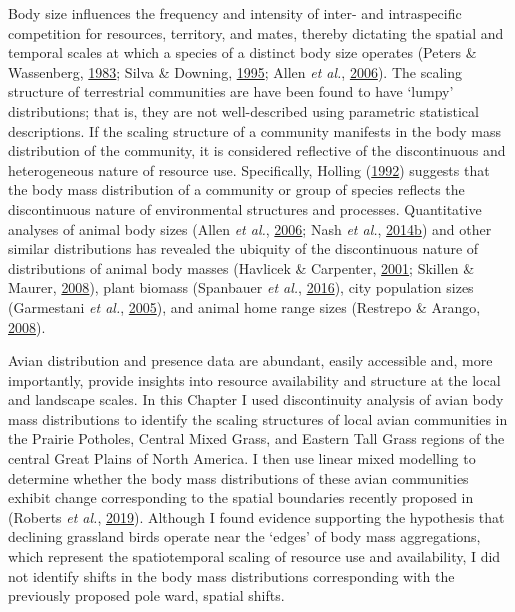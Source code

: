 \documentclass[12pt,twoside,openany]{reedthesis}
\begin{document}
Body size influences the frequency and intensity of inter- and intraspecific competition for resources, territory, and mates, thereby dictating the spatial and temporal scales at which a species of a distinct body size operates (Peters \& Wassenberg, \protect\hyperlink{ref-peters1983effect}{1983}; Silva \& Downing, \protect\hyperlink{ref-silva1995allometric}{1995}; Allen \emph{et al.}, \protect\hyperlink{ref-allen2006patterns}{2006}). The scaling structure of terrestrial communities are have been found to have `lumpy' distributions; that is, they are not well-described using parametric statistical descriptions. If the scaling structure of a community manifests in the body mass distribution of the community, it is considered reflective of the discontinuous and heterogeneous nature of resource use. Specifically, Holling (\protect\hyperlink{ref-holling1992cross}{1992}) suggests that the body mass distribution of a community or group of species reflects the discontinuous nature of environmental structures and processes. Quantitative analyses of animal body sizes (Allen \emph{et al.}, \protect\hyperlink{ref-allen2006patterns}{2006}; Nash \emph{et al.}, \protect\hyperlink{ref-nash2014habitat}{2014}\protect\hyperlink{ref-nash2014habitat}{b}) and other similar distributions has revealed the ubiquity of the discontinuous nature of distributions of animal body masses (Havlicek \& Carpenter, \protect\hyperlink{ref-havlicek2001pelagic}{2001}; Skillen \& Maurer, \protect\hyperlink{ref-skillen2008ecological}{2008}), plant biomass (Spanbauer \emph{et al.}, \protect\hyperlink{ref-spanbauer2016body}{2016}), city population sizes (Garmestani \emph{et al.}, \protect\hyperlink{ref-garmestani2005time}{2005}), and animal home range sizes (Restrepo \& Arango, \protect\hyperlink{ref-restrepo2008discontinuities}{2008}).

Avian distribution and presence data are abundant, easily accessible and, more importantly, provide insights into resource availability and structure at the local and landscape scales. In this Chapter I used discontinuity analysis of avian body mass distributions to identify the scaling structures of local avian communities in the Prairie Potholes, Central Mixed Grass, and Eastern Tall Grass regions of the central Great Plains of North America. I then use linear mixed modelling to determine whether the body mass distributions of these avian communities exhibit change corresponding to the spatial boundaries recently proposed in (Roberts \emph{et al.}, \protect\hyperlink{ref-roberts2019shifting}{2019}). Although I found evidence supporting the hypothesis that declining grassland birds operate near the `edges' of body mass aggregations, which represent the spatiotemporal scaling of resource use and availability, I did not identify shifts in the body mass distributions corresponding with the previously proposed pole ward, spatial shifts.
\end{document}
